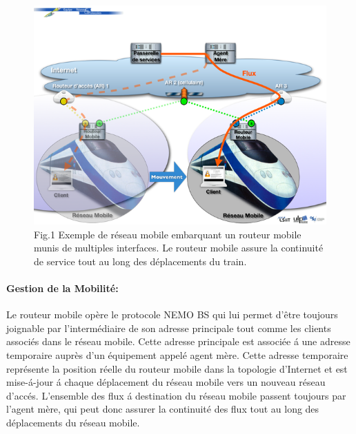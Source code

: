 \documentclass[12pt]{article}
\begin{document}
\begin{figure}[h]
\begin{center}
\includegraphics[scale=0.7]{R2.png}
\caption[9pt]{Fig.1 Exemple de r\'{e}seau mobile embarquant un routeur mobile munis de multiples interfaces. Le routeur mobile assure la continuit\'{e} de service tout au long des d\'{e}placements du train.}
\end{center}
\end{figure}

\newpage
\paragraph{Gestion de la Mobilit\'{e}:} 
Le routeur mobile op\`{e}re le protocole NEMO BS qui lui permet d'\^{e}tre toujours joignable par l'interm\'{e}diaire de son adresse principale tout comme les clients associ\'{e}s dans le r\'{e}seau mobile. Cette adresse principale est associ\'{e}e \'{a} une adresse temporaire aupr\`{e}s d'un \'{e}quipement appel\'{e} agent m\`{e}re. Cette adresse temporaire repr\'{e}sente la position r\'{e}elle du routeur mobile dans la topologie d'Internet et est mise-\'{a}-jour \'{a} chaque d\'{e}placement du r\'{e}seau mobile vers un nouveau r\'{e}seau d'acc\'{e}s.
L'ensemble des flux \'{a} destination du r\'{e}seau mobile passent toujours par l'agent m\`{e}re, qui peut donc assurer la continuit\'{e} des flux tout au long des d\'{e}placements du r\'{e}seau mobile.
\end{document}

